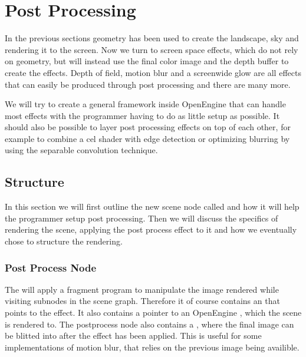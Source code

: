 \chapter{Post Processing}
\label{chap:pp}


In the previous sections geometry has been used to create the
landscape, sky and rendering it to the screen. Now we turn to screen
space effects, which do not rely on geometry, but will instead use the
final color image and the depth buffer to create the effects. Depth of
field, motion blur and a screenwide glow are all effects that can
easily be produced through post processing and there are many more.


We will try to create a general framework inside OpenEngine that can
handle most effects with the programmer having to do as little setup
as possible. It should also be possible to layer post processing
effects on top of each other, for example to combine a cel shader with
edge detection or optimizing blurring by using the separable
convolution technique.

\section{Structure}

In this section we will first outline the new scene node called
 and how it will help the programmer setup post
processing. Then we will discuss the specifics of rendering the scene,
applying the post process effect to it and how we eventually chose to
structure the rendering.

\subsection*{Post Process Node}

The  will apply a fragment program to
manipulate the image rendered while visiting subnodes in the scene
graph. Therefore it of course contains an 
that points to the effect. It also contains a pointer to an OpenEngine
, which the scene is rendered to. The postprocess
node also contains a , where the final image can be
blitted into after the effect has been applied. This is useful for
some implementations of motion blur, that relies on the previous image
being availible.

